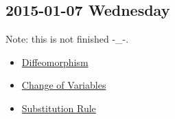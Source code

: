 
\subsection{2015-01-07 Wednesday}

Note: this is not finished -\_-.

\begin{itemize}
\item \hyperref[def:diffeomorphism]{Diffeomorphism}
\item \hyperref[thm:changeofvars]{Change of Variables}
\item \hyperref[thm:substitutionrule]{Substitution Rule}
\end{itemize}



